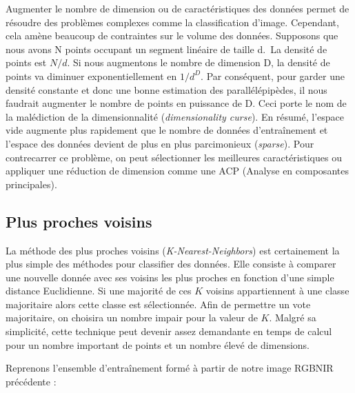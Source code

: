 \documentclass[
  french,
  11pt,
  letterpaper,
  open=any,
  twoside=false,
  french]{scrbook}
\begin{document}
Augmenter le nombre de dimension ou de caractéristiques des données
permet de résoudre des problèmes complexes comme la classification
d'image. Cependant, cela amène beaucoup de contraintes sur le volume des
données. Supposons que nous avons N points occupant un segment linéaire
de taille d.~La densité de points est \(N/d\). Si nous augmentons le
nombre de dimension D, la densité de points va diminuer
exponentiellement en \(1/d^D\). Par conséquent, pour garder une densité
constante et donc une bonne estimation des parallélépipèdes, il nous
faudrait augmenter le nombre de points en puissance de D. Ceci porte le
nom de la malédiction de la dimensionnalité (\emph{dimensionality
curse}). En résumé, l'espace vide augmente plus rapidement que le nombre
de données d'entraînement et l'espace des données devient de plus en
plus parcimonieux (\emph{sparse}). Pour contrecarrer ce problème, on
peut sélectionner les meilleures caractéristiques ou appliquer une
réduction de dimension comme une ACP (Analyse en composantes
principales).

\subsection{Plus proches voisins}\label{plus-proches-voisins}

La méthode des plus proches voisins (\emph{K-Nearest-Neighbors}) est
certainement la plus simple des méthodes pour classifier des données.
Elle consiste à comparer une nouvelle donnée avec ses voisins les plus
proches en fonction d'une simple distance Euclidienne. Si une majorité
de ces \(K\) voisins appartiennent à une classe majoritaire alors cette
classe est sélectionnée. Afin de permettre un vote majoritaire, on
choisira un nombre impair pour la valeur de \(K\). Malgré sa simplicité,
cette technique peut devenir assez demandante en temps de calcul pour un
nombre important de points et un nombre élevé de dimensions.

Reprenons l'ensemble d'entraînement formé à partir de notre image RGBNIR
précédente :
\end{document}
